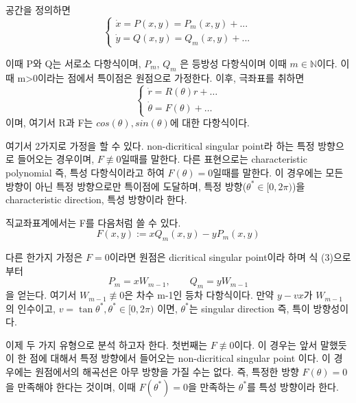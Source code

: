 \documentclass[10pt]{article}
\begin{document}
공간을 정의하면
\begin{equation}
    \begin{cases}
        \dot{x} = P(x, y) = P_{m}(x, y) + ...\\
        \dot{y} = Q(x, y) = Q_{m}(x, y) + ...
    \end{cases}
\end{equation}

이때 P와 Q는 서로소 다항식이며, \(P_{m}\), \(Q_{m}\) 은 등방성 다항식이며 이때 \(m \in \mathbb{N}\)이다.
이때 m>0이라는 점에서 특이점은 원점으로 가정한다.
이후, 극좌표를 취하면
\begin{equation}
    \begin{cases}
        \dot{r} = R(\theta)r + \dots\\
        \dot{\theta} = F(\theta)+\dots
    \end{cases}
\end{equation} 
이며, 여기서 R과 F는 \(cos(\theta), sin(\theta)\)에 대한 다항식이다.

\vspace{1em}

여기서 2가지로 가정을 할 수 있다. non-dicritical singular point라 하는 특정 방향으로 들어오는 경우이며, \(F \not\equiv 0\)일때를 말한다.
다른 표현으로는 characteristic polynomial 즉, 특성 다항식이라고 하여 \(F(\theta) = 0\)일때를 말한다.
이 경우에는 모든 방향이 아닌 특정 방향으로만 특이점에 도달하며, 특정 방향(\(\theta^* \in [0, 2\pi)\))을 characteristic direction, 특성 방향이라 한다.

\vspace{1em}

직교좌표계에서는 F를 다음처럼 쓸 수 있다.
\begin{equation}
    F(x, y) := xQ_{m}(x, y) - yP_{m}(x, y)
\end{equation} 

다른 한가지 가정은 \(F=0\)이라면 원점은 dicritical singular point이라 하며 식 (3)으로 부터
\begin{equation}
    P_{m} = xW_{m-1},\qquad Q_{m} =yW_{m-1}
\end{equation}
을 얻는다. 여기서 \(W_{m-1} \not\equiv 0\)은 차수 m-1인 등차 다항식이다. 
만약 \(y-vx\)가 \(W_{m-1}\)의 인수이고, \(v = \tan{\theta^*}, \theta^* \in [0, 2\pi)\) 이면, \(\theta^*\)는 singular direction 즉, 특이 방향성이다.

이제 두 가지 유형으로 분석 하고자 한다. 첫번째는 \(F \not\equiv 0\)이다.
이 경우는 앞서 말했듯이 한 점에 대해서 특정 방향에서 들어오는 non-dicritical singular point 이다.
이 경우에는 원점에서의 해곡선은 아무 방향을 가질 수는 없다. 즉, 특정한 방향 \(F(\theta)=0\)을 만족해야 한다는 것이며, 이때 \(F(\theta^*)=0\)을 만족하는 \(\theta^*\)를 특성 방향이라 한다.
\end{document}
